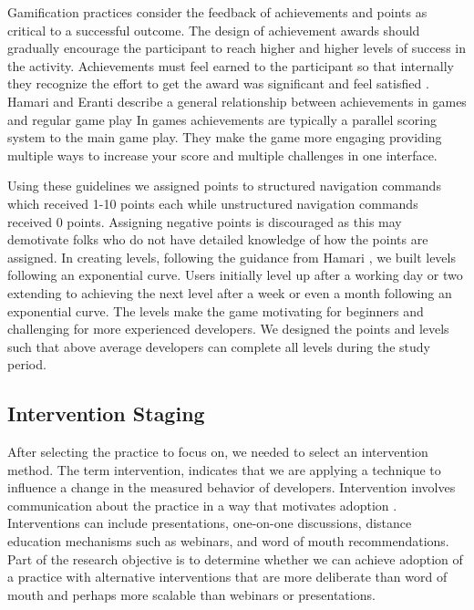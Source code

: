 \documentclass{sig-alternate}
\begin{document}
Gamification practices consider the feedback of achievements and points as critical to a successful outcome.  The design of achievement awards should gradually encourage the participant to reach higher and higher levels of success in the activity.  Achievements must feel earned to the participant so that internally they recognize the effort to get the award was significant and feel satisfied  \cite{wbsnipes:Hamari2011Framework}.  Hamari and Eranti describe a general relationship between achievements in games and regular game play      In games achievements are typically a parallel scoring system to the main game play.  They make the game more engaging providing multiple ways to increase your score and multiple challenges in one interface.

Using these guidelines we assigned points to structured navigation commands which received 1-10 points each while unstructured navigation commands received 0 points.  Assigning negative points is discouraged as this may demotivate folks who do not have detailed knowledge of how the points are assigned.\cite{}   In creating levels, following the guidance from Hamari \cite{wbsnipes:Hamari2011Framework}, we built levels following an exponential curve.  Users initially level up after a working day or two extending to achieving the next level after a week or even a month following an exponential curve.  The levels make the game motivating for beginners and challenging for more experienced developers.  We designed the points and levels such that above average developers can complete all levels during the study period.

\subsection{Intervention Staging}

After selecting the practice to focus on, we needed to select an intervention method.  The term intervention, indicates that we are applying a technique to influence a change in the measured behavior of developers.  Intervention involves communication about the practice in a way that motivates adoption \cite{}.  Interventions can include presentations, one-on-one discussions, distance education mechanisms such as webinars, and word of mouth recommendations.  Part of the research objective is to determine whether we can achieve adoption of a practice with alternative interventions that are more deliberate than word of mouth and perhaps more scalable than webinars or presentations.  
\end{document}
